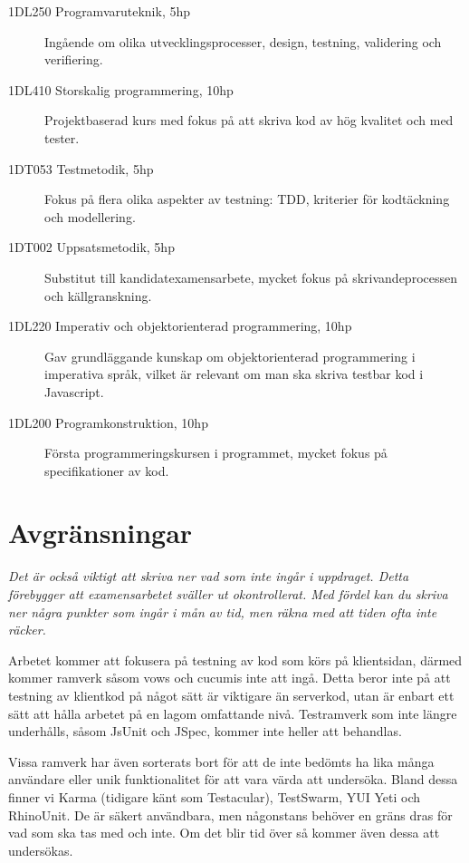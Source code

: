 \documentclass[11pt]{article}
\begin{document}
\begin{description}
\item[1DL250 Programvaruteknik, 5hp] Ingående om olika utvecklingsprocesser, design, testning, validering och verifiering.
\item[1DL410 Storskalig programmering, 10hp] Projektbaserad kurs med fokus på att skriva kod av hög kvalitet och med tester.
\item[1DT053 Testmetodik, 5hp] Fokus på flera olika aspekter av testning: TDD, kriterier för kodtäckning och modellering.
\item[1DT002 Uppsatsmetodik, 5hp] Substitut till kandidatexamensarbete, mycket fokus på skrivandeprocessen och källgranskning.
\item[1DL220 Imperativ och objektorienterad programmering, 10hp] Gav grundläggande kunskap om objektorienterad programmering i imperativa språk, vilket är relevant om man ska skriva testbar kod i Javascript.
\item[1DL200 Programkonstruktion, 10hp] Första programmeringskursen i programmet, mycket fokus på specifikationer av kod.
\end{description}

\section{Avgränsningar}

\textit{Det är också viktigt att skriva ner vad som inte ingår i uppdraget. Detta förebygger att examensarbetet sväller ut okontrollerat. Med fördel kan du skriva ner några punkter som ingår i mån av tid, men räkna med att tiden ofta inte räcker.}

Arbetet kommer att fokusera på testning av kod som körs på klientsidan, därmed kommer ramverk såsom vows\cite{Vows} och cucumis\cite{Cucumis} inte att ingå. Detta beror inte på att testning av klientkod på något sätt är viktigare än serverkod, utan är enbart ett sätt att hålla arbetet på en lagom omfattande nivå. Testramverk som inte längre underhålls, såsom JsUnit\cite{JsUnitGithub} och JSpec\cite{JSpec}, kommer inte heller att behandlas.

Vissa ramverk har även sorterats bort för att de inte bedömts ha lika många användare eller unik funktionalitet för att vara värda att undersöka. Bland dessa finner vi Karma (tidigare känt som Testacular), TestSwarm, YUI Yeti och RhinoUnit. De är säkert användbara, men någonstans behöver en gräns dras för vad som ska tas med och inte. Om det blir tid över så kommer även dessa att undersökas.
\end{document}
